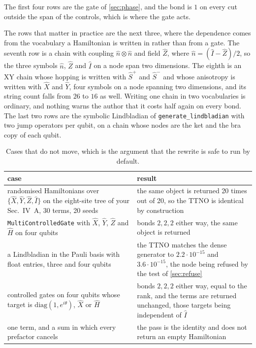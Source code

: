 \documentclass[11pt,a4paper]{article}
\newcommand{\code}[1]{\texttt{#1}}
\begin{document}
The first four rows are the gate of \cref{sec:phase}, and the bond is $1$ on every cut outside the
span of the controls, which is where the gate acts.

The rows that matter in practice are the next three, where the dependence comes from the vocabulary
a Hamiltonian is written in rather than from a gate. The seventh row is a chain with coupling
$\hat{n}\otimes\hat{n}$ and field $\hat{Z}$, where $\hat{n} = (\hat{I} - \hat{Z})/2$, so the three
symbols $\hat{n}$, $\hat{Z}$ and $\hat{I}$ on a node span two dimensions. The eighth is an XY chain
whose hopping is written with $\hat{S}^{+}$ and $\hat{S}^{-}$ and whose anisotropy is written with
$\hat{X}$ and $\hat{Y}$, four symbols on a node spanning two dimensions, and its string count falls
from $26$ to $16$ as well. Writing one chain in two vocabularies is ordinary, and nothing warns the
author that it costs half again on every bond. The last two rows are the symbolic Lindbladian of
\code{generate\_lindbladian} with two jump operators per qubit, on a chain whose nodes are the ket
and the bra copy of each qubit.

\begin{table}[htbp]
\caption{Cases that do not move, which is the argument that the rewrite is safe to run by default.}
\label{tab:unmoved}
\centering
\begin{tabularx}{\textwidth}{>{\raggedright\arraybackslash}p{}L}
\toprule
case & result \\
\midrule
randomised Hamiltonians over $\{\hat{X},\hat{Y},\hat{Z},\hat{I}\}$ on the eight-site tree of
your Sec.~IV~A, 30 terms, 20 seeds
  & the same object is returned 20 times out of 20, so the TTNO is identical by construction \\
\code{MultiControlledGate} with $\hat{X}$, $\hat{Y}$, $\hat{Z}$ and $\hat{H}$ on four qubits
  & bonds $2,2,2$ either way, the same object is returned \\
a Lindbladian in the Pauli basis with float entries, three and four qubits
  & the TTNO matches the dense generator to $2.2\cdot 10^{-15}$ and $3.6\cdot 10^{-15}$, the node
    being refused by the test of \cref{sec:refuse} \\
controlled gates on four qubits whose target is $\mathrm{diag}(1, e^{i\theta})$, $\hat{X}$ or
$\hat{H}$
  & bonds $2,2,2$ either way, equal to the rank, and the terms are returned unchanged, those
    targets being independent of $\hat{I}$ \\
one term, and a sum in which every prefactor cancels
  & the pass is the identity and does not return an empty Hamiltonian \\
\bottomrule
\end{tabularx}
\end{table}
\end{document}
